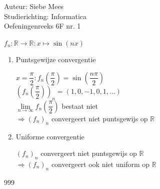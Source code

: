 \documentclass[a4paper]{article}
\begin{document}
  
\noindent \large Auteur: Siebe Mees \\
\noindent \large Studierichting: Informatica\\
\noindent \large Oefeningenreeks 6F nr. 1\\

\medskip

\normalsize

$ f_n:\mathbb{R}\rightarrow \mathbb{R}: x\mapsto \sin(nx) $\\

\begin{enumerate}

\item Puntsgewijze convergentie

$ x=\dfrac{\pi}{2}: f_n\left(\dfrac{\pi}{2}\right)=\sin\left(\dfrac{n\pi}{2}\right) $\\

$ \left(f_n\left(\dfrac{\pi}{2}\right)\right)_n=(1,0,-1,0,1,\ldots) $\\

$ \lim\limits_{n \rightarrow \infty} f_n\left(\dfrac{\pi}{2}\right) $ bestaat niet $ $\\

$ \Rightarrow (f_n)_n $ convergeert niet puntsgewijs op $ \mathbb{R} $\\

\item Uniforme convergentie

$ (f_n)_n $ convergeert niet puntsgewijs op $ \mathbb{R} $\\

$ \Rightarrow (f_n)_n $ convergeert ook niet uniform op $ \mathbb{R} $\\

\end{enumerate}

\begin{thebibliography}{999}
\end{thebibliography}
\end{document}
